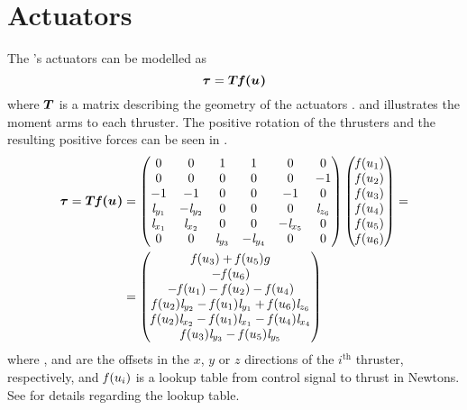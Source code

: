 \section{Actuators}
The \abbrROV's actuators can be modelled as
\begin{equation}
    \boldsymbol{\tau} = \boldsymbol{T} \boldsymbol{\mathit{f}(u_{})} 
\end{equation}
where $\boldsymbol{T}$ is a matrix describing the geometry of the actuators \citep[p. 401]{fossen2011}.  and  illustrates the moment arms to each thruster. The positive rotation of the thrusters and the resulting positive forces can be seen in .
\begin{equation}
\begin{split}
    \boldsymbol{\tau} = \boldsymbol{T} \boldsymbol{\mathit{f}(u_{})} 
    &=
    \begin{pmatrix}
    0& 0& 1& 1& 0& 0\\
    0& 0& 0&  0& 0& -1\\
    -1& -1& 0& 0& -1& 0\\
    \mathit{l}_{y_{1}} & -\mathit{l}_{y_{2}} & 0 &  0 &  0 & \mathit{l}_{z_{6}} \\
    \mathit{l}_{x_{1}} & \mathit{l}_{x_{2}} & 0 & 0 & -\mathit{l}_{x_{5}} & 0 \\
    0 & 0 & \mathit{l}_{y_{3}} & -\mathit{l}_{y_{4}} & 0 & 0 \\
    \end{pmatrix}
    \begin{pmatrix}
    \mathit{f}(u_{1}) \\
    \mathit{f}(u_{2}) \\
    \mathit{f}(u_{3}) \\
    \mathit{f}(u_{4}) \\
    \mathit{f}(u_{5}) \\
    \mathit{f}(u_{6}) \\
    \end{pmatrix}
    = \\
    &=\begin{pmatrix}
     \mathit{f}(u_{3}) + \mathit{f}(u_{5}) g \\
     -\mathit{f}(u_{6}) \\
     -\mathit{f}(u_{1}) - \mathit{f}(u_{2}) - \mathit{f}(u_{4}) \\
    \mathit{f}(u_{2}) \mathit{l}_{y_{2}} - \mathit{f}(u_{1}) \mathit{l}_{y_{1}} + \mathit{f}(u_{6}) \mathit{l}_{z_{6}} \\
    \mathit{f}(u_{2}) \mathit{l}_{x_{2}} - \mathit{f}(u_{1}) \mathit{l}_{x_{1}} - \mathit{f}(u_{4}) \mathit{l}_{x_{4}} \\
    \mathit{f}(u_{3}) \mathit{l}_{y_{3}} - \mathit{f}(u_{5}) \mathit{l}_{y_{5}} \\
    \end{pmatrix}
\end{split}
\end{equation}
where ,  and  are the offsets in the $x$, $y$ or $z$ directions of the $i^\text{th}$ thruster, respectively, and $\mathit{f}(u_{i})$ is a lookup table from control signal to thrust in Newtons. See  for details regarding the lookup table.

